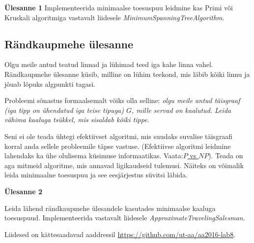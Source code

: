 \documentclass[a4paper]{article}
\begin{document}
\begin{problem}

\textbf{Ülesanne 1}
Implementeerida minimaalse toesuspuu leidmine kas Primi või Kruskali algoritmiga vastavalt liidesele \textit{MinimumSpanningTreeAlgorithm}.
\end{problem}

{\center
\subsection*{Rändkaupmehe ülesanne}
}

Olgu meile antud teatud linnad ja lühimad teed iga kahe linna vahel. Rändkaupmehe ülesanne küsib, milline on lühim teekond, mis läbib kõiki linnu ja jõuab lõpuks algpunkti tagasi.

Probleemi sõnastus formaalsemalt võiks olla selline: \textit{olgu meile antud täisgraaf (iga tipp on ühendatud iga teise tipuga) $G$, mille servad on kaalutud. Leida vähima kaaluga tsükkel, mis sisaldab kõiki tippe.}

Seni ei ole teada ühtegi efektiivset algoritmi, mis suudaks suvalise täisgraafi korral anda sellele probleemile täpse vastuse. (Efektiivse algoritmi leidmine lahendaks ka ühe olulisema küsimuse informaatikas. Vaata:\newpage \href{https://en.wikipedia.org/wiki/P_versus_NP_problem}{$P$ vs $NP$}). Teada on aga mitmeid algoritme, mis annavad ligikaudseid tulemusi. Näiteks on võimalik leida minimaalne toesuspuu ja see eesjärjestus süvitsi läbida.

\begin{problem}
\textbf{Ülesanne 2}

Leida lähend rändkaupmehe ülesandele kasutades minimaalse kaaluga toesuspuud. Implementeerida vastavalt liidesele \textit{ApproximateTravelingSalesman}.
\end{problem}

Liidesed on kättesaadavad aaddressil \url{https://github.com/ut-aa/aa2016-lab8}.
\end{document}
